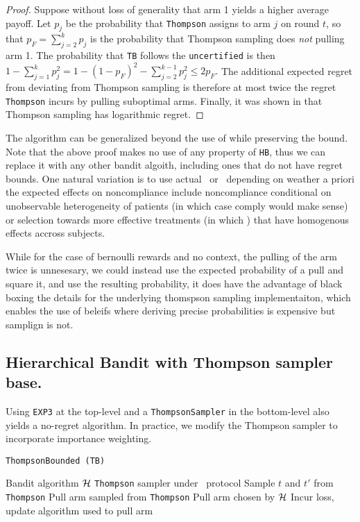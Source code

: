 \begin{proof}	
	Suppose without loss of generality that arm 1 yields a higher average payoff. Let $p_j$ be the probability that \texttt{Thompson} assigns to arm $j$ on round $t$, so that $p_F=\sum_{j=2}^kp_j$ is the probability that Thompson sampling does \emph{not} pulling arm 1. The probability that \texttt{TB} follows the \texttt{uncertified} is then 
	$1-\sum_{j=1}^kp_j^2  = 
	    1-(1-p_F)^2 - \sum_{j=2}^{k-1}p_j^2 \leq 2p_F.$
	The additional expected regret from deviating from Thompson sampling is therefore at most twice the regret \texttt{Thompson} incurs by pulling suboptimal arms. Finally, it was shown in \cite{agrawal:12,kaufmann:12} that Thompson sampling has logarithmic regret.
\end{proof}

The algorithm can be generalized beyond the use of while preserving the bound. Note that the above proof makes no use of any property of \texttt{HB}, thus we can replace it with any other bandit algoith, including ones that do not have regret bounds. One natural variation is to use actual  \actual\ or \comply\ depending on weather a priori the expected effects on noncompliance include noncompliance conditional on unobservable heterogeneity of patients  (in which case comply would make sense) or selection towards more effective treatments (in which ) that have homogenous effects accross subjects.

While for the case of bernoulli rewards and no context, the pulling of the arm twice is unnesesary, we could instead use the expected probability of a pull and square it, and use the resulting probability, it does have the advantage of black boxing the details for the underlying thomspson sampling implementaiton, which enables the use of beleifs where deriving precise probabilities is expensive but samplign is not. 


\subsection{Hierarchical Bandit with Thompson sampler base.}


Using  \texttt{EXP3} at the top-level and a \texttt{ThompsonSampler} in the  bottom-level also yields a no-regret algorithm. In practice, we modify the Thompson sampler to incorporate importance weighting.

\begin{algorithm}
   \caption{\texttt{ThompsonBounded (TB)}}
   \label{alg:dt}
   \begin{algorithmic}   
    Bandit algorithm ${\mathcal H}$
    \texttt{Thompson} sampler under \chosen\, protocol
	\STATE Sample $t$ and $t'$ from \texttt{Thompson}
	\STATE Pull arm sampled from \texttt{Thompson}
	\ELSE
	\STATE Pull arm chosen by ${\mathcal H}$
	\ENDIF
	\STATE Incur loss, update algorithm used to pull arm
   	\ENDFOR
   	\end{algorithmic}
\end{algorithm}




